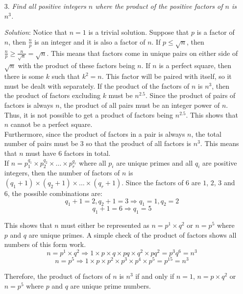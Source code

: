 \documentclass{article}
\begin{document}
\begin{enumerate}[1.]
\vspace{6.81mm}

\item[3.] %
\textit{Find all positive integers $n$ where the product of the positive factors of $n$ is $n^3$.}

\textit{Solution}: Notice that $n = 1$ is a trivial solution. Suppose that $p$ is a factor of $n$, then $\frac{n}{p}$ is an integer and it is also a factor of $n$. If $p \le \sqrt{n}$, then $\frac{n}{p} \ge \frac{n}{\sqrt{n}} = \sqrt{n}$.
This means that factors come in unique pairs on either side of $\sqrt{n}$ with the product of these factors being $n$. If $n$ is a perfect square, then there is some $k$ such that $k^2 = n$. This factor will be paired with itself, so it must be dealt with separately.
If the product of the factors of $n$ is $n^3$, then the product of factors excluding $k$ must be $n^{2.5}$. Since the product of pairs of factors is always $n$, the product of all pairs must be an integer power of $n$. Thus, it is not possible to get a product of factors being $n^{2.5}$. This shows that $n$ cannot be a perfect square.\\

Furthermore, since the product of factors in a pair is always $n$, the total number of pairs must be $3$ so that the product of all factors is $n^3$. This means that $n$ must have $6$ factors in total.\\

If $n = p_1^{q_1} \times p_2^{q_2} \times \dots \times p_r^{q_r}$ where all $p_i$ are unique primes and all $q_i$ are positive integers, then the number of factors of $n$ is $(q_1 + 1) \times (q_2 + 1) \times \dots \times (q_r + 1)$. Since the factors of $6$ are $1$, $2$, $3$ and $6$, the possible combinations are:
$$q_1 + 1 = 2, q_2 + 1 = 3 \Rightarrow q_1 = 1, q_2 = 2$$
$$q_1 + 1 = 6 \Rightarrow q_1 = 5$$

This shows that $n$ must either be represented as $n = p^1 \times q^2$ or $n = p^5$ where $p$ and $q$ are unique primes. A simple check of the product of factors shows all numbers of this form work.
$$n = p^1 \times q^2 \Rightarrow 1 \times p \times q \times pq \times q^2 \times pq^2 = p^3q^6 = n^3$$
$$n = p^5 \Rightarrow 1 \times p \times p^2 \times p^3 \times p^4 \times p^5 = p^{15} = n^3$$

Therefore, the product of factors of $n$ is $n^3$ if and only if $n = 1$, $n = p \times q^2$ or $n = p^5$ where $p$ and $q$ are unique prime numbers.


\end{enumerate}
\end{document}
